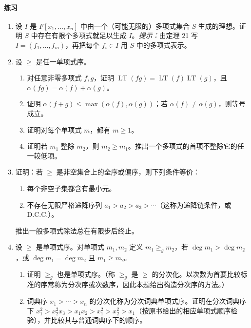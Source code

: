 \paragraph{练习}
\begin{enumerate}[label=\arabic*.]
	\item 设 $I$ 是 $F[x_1,\ldots,x_n]$ 中由一个（可能无限的）多项式集合 $S$ 生成的理想。证明 $S$ 中存在有限个多项式就足以生成 $I$。\emph{提示：}由定理 21 写 $I=(f_1,\ldots,f_m)$，再把每个 $f_i\in I$ 用 $S$ 中的多项式表示。
	
	\item 设 $\geq$ 是任一单项式序。
	\begin{enumerate}[label=(\alph*)]
		\item 对任意非零多项式 $f,g$，证明 $\operatorname{LT}(fg)=\operatorname{LT}(f)\operatorname{LT}(g)$，且 $\alpha(fg)=\alpha(f)+\alpha(g)$。
		\item 证明 $\alpha(f+g)\leq\max(\alpha(f),\alpha(g))$；若 $\alpha(f)\neq\alpha(g)$，则等号成立。
		\item 证明对每个单项式 $m$，都有 $m\geq1$。
		\item 证明若 $m_1$ 整除 $m_2$，则 $m_2\geq m_1$。推出一个多项式的首项不整除它的任一较低项。
	\end{enumerate}
	
	\item 证明：若 $\geq$ 是非空集合上的全序或偏序，则下列条件等价：
	\begin{enumerate}[label=(\roman*)]
		\item 每个非空子集都含有最小元。
		\item 不存在无限严格递降序列 $a_1>a_2>a_3>\cdots$（这称为递降链条件，或 D.C.C.）。
	\end{enumerate}
	推出一般多项式除法总在有限步后终止。
	
	\item 设 $\geq$ 是单项式序。对单项式 $m_1,m_2$ 定义 $m_1\geq_g m_2$，若 $\deg m_1>\deg m_2$，或 $\deg m_1=\deg m_2$ 且 $m_1\geq m_2$。
	\begin{enumerate}[label=(\alph*)]
		\item 证明 $\geq_g$ 也是单项式序。（称 $\geq_g$ 是 $\geq$ 的分次化。以次数为首要比较标准的序常称为分次序或次数序，因此本题给出构造分次序的方法。）
		\item 词典序 $x_1>\cdots>x_n$ 的分次化称为分次词典单项式序。证明在分次词典序下 $x_1^2>x_2^2x_3>x_1x_2>x_1^2>x_2^2>x_1$（按原书给出的相应单项式顺序检验），并比较其与普通词典序下的顺序。
	\end{enumerate}
	

\end{enumerate}

